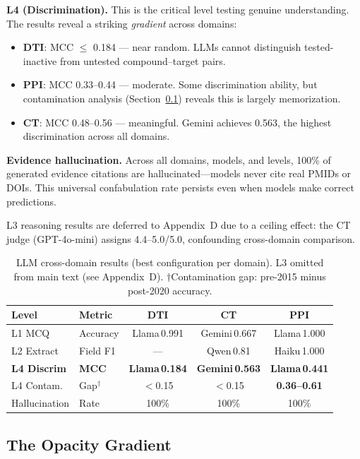 \textbf{L4 (Discrimination).} This is the critical level testing genuine understanding. The results reveal a striking \emph{gradient} across domains:
\begin{itemize}[nosep,leftmargin=*]
    \item \textbf{DTI}: MCC $\leq$ 0.184 --- near random. LLMs cannot distinguish tested-inactive from untested compound--target pairs.
    \item \textbf{PPI}: MCC 0.33--0.44 --- moderate. Some discrimination ability, but contamination analysis (Section~\ref{sec:exp-gradient}) reveals this is largely memorization.
    \item \textbf{CT}: MCC 0.48--0.56 --- meaningful. Gemini achieves 0.563, the highest discrimination across all domains.
\end{itemize}

\textbf{Evidence hallucination.} Across all domains, models, and levels, 100\% of generated evidence citations are hallucinated---models never cite real PMIDs or DOIs. This universal confabulation rate persists even when models make correct predictions.

L3 reasoning results are deferred to Appendix~D due to a ceiling effect: the CT judge (GPT-4o-mini) assigns 4.4--5.0/5.0, confounding cross-domain comparison.

\begin{table}[t]
\centering
\caption{LLM cross-domain results (best configuration per domain). L3 omitted from main text (see Appendix~D). $\dagger$Contamination gap: pre-2015 minus post-2020 accuracy.}
\label{tab:llm_results}
\small
\begin{tabular}{@{}llccc@{}}
\toprule
\textbf{Level} & \textbf{Metric} & \textbf{DTI} & \textbf{CT} & \textbf{PPI} \\
\midrule
L1 MCQ & Accuracy & Llama\,0.991 & Gemini\,0.667 & Llama\,1.000 \\
L2 Extract & Field F1 & --- & Qwen\,0.81 & Haiku\,1.000 \\
\midrule
\textbf{L4 Discrim} & \textbf{MCC} & \textbf{Llama\,0.184} & \textbf{Gemini\,0.563} & \textbf{Llama\,0.441} \\
L4 Contam. & Gap$^\dagger$ & $<$0.15 & $<$0.15 & \textbf{0.36--0.61} \\
\midrule
Hallucination & Rate & 100\% & 100\% & 100\% \\
\bottomrule
\end{tabular}
\end{table}


\subsection{The Opacity Gradient}
\label{sec:exp-gradient}

